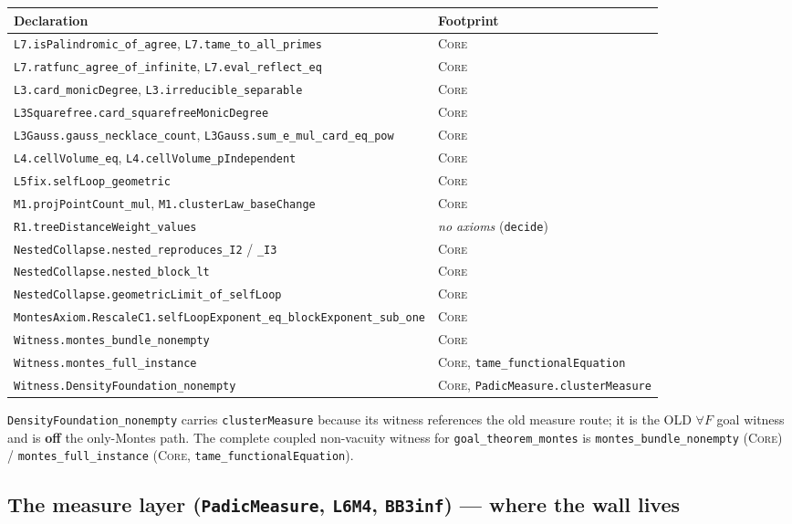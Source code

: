 \documentclass[11pt]{article}
\newcommand{\code}[1]{\texttt{#1}}
\newcommand{\Core}{\textsc{Core}}
\begin{document}
\begin{longtable}{@{}p{}p{}@{}}
\toprule
\textbf{Declaration} & \textbf{Footprint} \\
\midrule
\endhead
\code{L7.isPalindromic\_of\_agree}, \code{L7.tame\_to\_all\_primes} & \Core \\
\code{L7.ratfunc\_agree\_of\_infinite}, \code{L7.eval\_reflect\_eq} & \Core \\
\code{L3.card\_monicDegree}, \code{L3.irreducible\_separable} & \Core \\
\code{L3Squarefree.card\_squarefreeMonicDegree} & \Core \\
\code{L3Gauss.gauss\_necklace\_count}, \code{L3Gauss.sum\_e\_mul\_card\_eq\_pow} & \Core \\
\code{L4.cellVolume\_eq}, \code{L4.cellVolume\_pIndependent} & \Core \\
\code{L5fix.selfLoop\_geometric} & \Core \\
\code{M1.projPointCount\_mul}, \code{M1.clusterLaw\_baseChange} & \Core \\
\code{R1.treeDistanceWeight\_values} & \emph{no axioms} (\code{decide}) \\
\code{NestedCollapse.nested\_reproduces\_I2} / \code{\_I3} & \Core \\
\code{NestedCollapse.nested\_block\_lt} & \Core \\
\code{NestedCollapse.geometricLimit\_of\_selfLoop} & \Core \\
\code{MontesAxiom.RescaleC1.selfLoopExponent\_eq\_blockExponent\_sub\_one} & \Core \\
\code{Witness.montes\_bundle\_nonempty} & \Core \\
\code{Witness.montes\_full\_instance} & \Core, \code{tame\_functionalEquation} \\
\code{Witness.DensityFoundation\_nonempty} & \Core, \code{PadicMeasure.clusterMeasure} \\
\bottomrule
\end{longtable}

\noindent \code{DensityFoundation\_nonempty} carries \code{clusterMeasure} because its
witness references the old measure route; it is the OLD $\forall F$ goal witness and is
\textbf{off} the only-Montes path. The complete coupled non-vacuity witness for
\code{goal\_theorem\_montes} is \code{montes\_bundle\_nonempty} (\Core) /
\code{montes\_full\_instance} (\Core, \code{tame\_functionalEquation}).

\subsection{The measure layer (\code{PadicMeasure}, \code{L6M4}, \code{BB3inf}) ---
where the wall lives}
\end{document}
